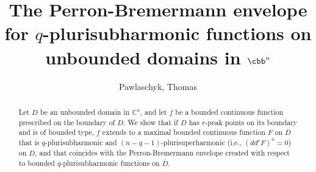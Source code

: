 \documentclass[reqno]{amsart}
\title[Perron-Bremermann envelope for $q$-plurisubharmonic functions]{The Perron-Bremermann envelope for $q$-plurisubharmonic functions on unbounded domains in $\cbb^n$}
\author{Pawlaschyk, Thomas}
\theoremstyle{definition}
\numberwithin{equation}{section}
\begin{document}
\begin{abstract}

Let $D$ be an unbounded domain in $\mathbb{C}^n$, and let $f$ be a bounded continuous function prescribed on the boundary of $D$. We show that if $D$ has $r$-peak points on its boundary and is of bounded type, $f$ extends to a maximal bounded continuous function $F$ on $\overline{D}$ that is $q$-plurisubharmonic and $(n-q-1)$-plurisuperharmonic (i.e., $(dd^c F)^n=0$) on $D$, and that coincides with the Perron-Bremermann envelope created with respect to bounded $q$-plurisubharmonic functions on $\overline{D}$.


\end{abstract}

\maketitle


\end{document}
